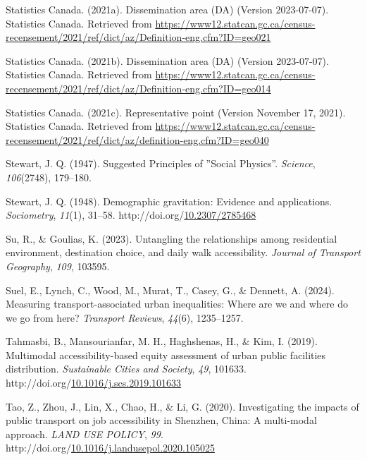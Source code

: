 \documentclass[
11pt, %
oneside, %
english, %
singlespacing, %
]{macthesis} %
\newlength{\cslhangindent}
\newenvironment{CSLReferences}[2] %
{\begin{list}{}{%
	\setlength{\itemindent}{0pt}
	\setlength{\leftmargin}{0pt}
	\setlength{\parsep}{0pt}
	\ifodd #1
	\setlength{\leftmargin}{\cslhangindent}
	\setlength{\itemindent}{-1\cslhangindent}
	\fi
	\setlength{\itemsep}{#2\baselineskip}}}
{\end{list}}
\begin{document}
\begin{CSLReferences}{1}{0}
Statistics Canada. (2021a). Dissemination area (DA) (Version 2023-07-07). Statistics Canada. Retrieved from \url{https://www12.statcan.gc.ca/census-recensement/2021/ref/dict/az/Definition-eng.cfm?ID=geo021}

Statistics Canada. (2021b). Dissemination area (DA) (Version 2023-07-07). Statistics Canada. Retrieved from \url{https://www12.statcan.gc.ca/census-recensement/2021/ref/dict/az/Definition-eng.cfm?ID=geo014}

Statistics Canada. (2021c). Representative point (Version November 17, 2021). Statistics Canada. Retrieved from \url{https://www12.statcan.gc.ca/census-recensement/2021/ref/dict/az/definition-eng.cfm?ID=geo040}

Stewart, J. Q. (1947). Suggested {Principles} of ''{Social} {Physics}''. \emph{Science}, \emph{106}(2748), 179--180.

Stewart, J. Q. (1948). Demographic gravitation: Evidence and applications. \emph{Sociometry}, \emph{11}(1), 31--58. http://doi.org/\href{https://doi.org/10.2307/2785468}{10.2307/2785468}

Su, R., \& Goulias, K. (2023). Untangling the relationships among residential environment, destination choice, and daily walk accessibility. \emph{Journal of Transport Geography}, \emph{109}, 103595.

Suel, E., Lynch, C., Wood, M., Murat, T., Casey, G., \& Dennett, A. (2024). Measuring transport-associated urban inequalities: Where are we and where do we go from here? \emph{Transport Reviews}, \emph{44}(6), 1235--1257.

Tahmasbi, B., Mansourianfar, M. H., Haghshenas, H., \& Kim, I. (2019). Multimodal accessibility-based equity assessment of urban public facilities distribution. \emph{Sustainable Cities and Society}, \emph{49}, 101633. http://doi.org/\href{https://doi.org/10.1016/j.scs.2019.101633}{10.1016/j.scs.2019.101633}

Tao, Z., Zhou, J., Lin, X., Chao, H., \& Li, G. (2020). Investigating the impacts of public transport on job accessibility in {Shenzhen}, {China}: A multi-modal approach. \emph{LAND USE POLICY}, \emph{99}. http://doi.org/\href{https://doi.org/10.1016/j.landusepol.2020.105025}{10.1016/j.landusepol.2020.105025}


\end{CSLReferences}
\end{document}
